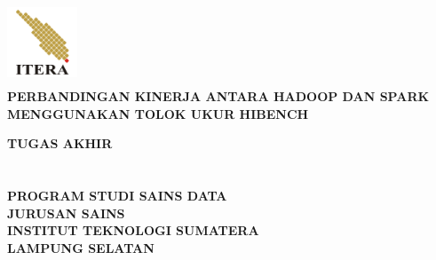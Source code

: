 \begin{titlepage}
\begin{center}
\includegraphics[height=2.5cm, width=2.1cm]{LogoITERA.png}\\[5ex]
\textbf{\fontsize{14pt}{0}\selectfont PERBANDINGAN KINERJA ANTARA HADOOP DAN SPARK MENGGUNAKAN TOLOK UKUR HIBENCH}\\
\vspace{3cm}

\textbf{\fontsize{14pt}{0}\selectfont  TUGAS AKHIR}\\[18ex]
\textbf{\fontsize{12pt}{0}\selectfont{Dimas Wahyu Saputro}}\\ 
\textbf{\fontsize{12pt}{0}\selectfont{120450081}}\\[20ex]
\textbf{\fontsize{12pt}{0}\selectfont PROGRAM STUDI SAINS DATA}\\
\textbf{\fontsize{12pt}{0}\selectfont JURUSAN SAINS}\\
\textbf{\fontsize{12pt}{0}\selectfont INSTITUT TEKNOLOGI SUMATERA}\\
\textbf{\fontsize{12pt}{0}\selectfont LAMPUNG SELATAN}\\
\textbf{\fontsize{12pt}{0}}\\
\vspace{3cm}
\end{center}
\end{titlepage}
